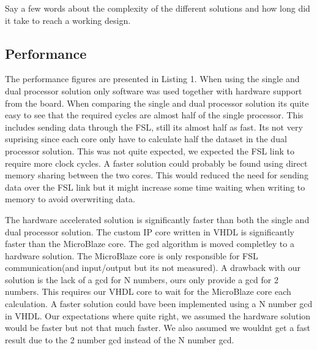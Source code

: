 \documentclass[11pt]{article}
\begin{document}
Say a few words about the complexity of the different solutions and how long did it take to reach a working design.
 
\subsection{Performance}
The performance figures are presented in Listing 1. When using the single and dual processor solution only software was used together with hardware support from the board. When comparing the single and dual processor solution its quite easy to see that the required cycles are almost half of the single processor. This includes sending data through the FSL, still its almost half as fast. Its not very suprising since each core only have to calculate half the dataset in the dual processor solution. This was not quite expected, we expected the FSL link to require more clock cycles. A faster solution could probably be found using direct memory sharing between the two cores. This would reduced the need for sending data over the FSL link but it might increase some time waiting when writing to memory to avoid overwriting data.

The hardware accelerated solution is significantly faster than both the single and dual processor solution. The custom IP core written in VHDL is significantly faster than the MicroBlaze core. The gcd algorithm is moved completley to a hardware solution. The MicroBlaze core is only responsible for FSL communication(and input/output but its not measured). A drawback with our solution is the lack of a gcd for N numbers, ours only provide a gcd for 2 numbers. This requires our VHDL core to wait for the MicroBlaze core each calculation. A faster solution could bave been implemented using a N number gcd in VHDL. Our expectations where quite right, we assumed the hardware solution would be faster but not that much faster. We also assumed we wouldnt get a fast result due to the 2 number gcd instead of the N number gcd.
\end{document}
